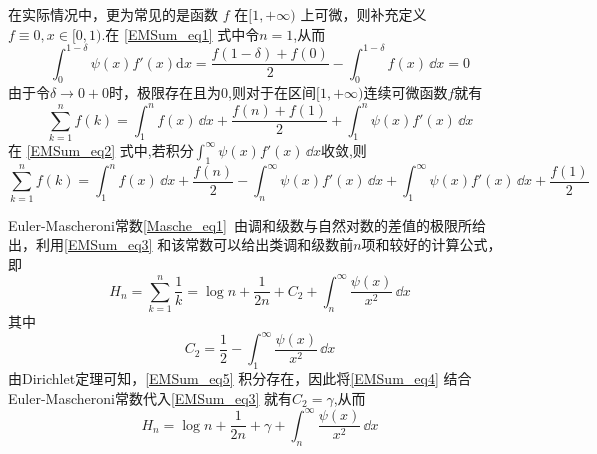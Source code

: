 在实际情况中，更为常见的是函数 $f$ 在$[1,+\infty)$ 上可微，则补充定义$ f\equiv 0,x\in[0,1)$.在 \autoref{EMSum_eq1} 式中令$n=1$,从而
\[
    \int_{0}^{1-\delta}\psi(x)f'(x)\mathrm{d}x
    =\frac{f(1-\delta)+f(0)}{2}-\int_{0}^{1-\delta}f(x)\,\dd x=0
\]
由于令$\delta\to0+0$时，极限存在且为$0$,则对于在区间$[1,+\infty)$连续可微函数$f$就有
\begin{equation}\label{EMSum_eq2}
    \sum_{k=1}^{n}f(k)
    =\int_{1}^{n}f(x)\,\dd x+\frac{f(n)+f(1)}{2}+\int_{1}^{n}\psi(x)f'(x)\,\dd x
\end{equation}
在 \autoref{EMSum_eq2}  式中,若积分$\displaystyle{\int_{1}^{\infty}\psi(x)f'(x)\,\dd x}$收敛,则
\begin{equation}\label{EMSum_eq3}
    \sum_{k=1}^{n}f(k)=\int_{1}^{n}f(x)\,\dd x
    +\frac{f(n)}{2}-\int_{n}^{\infty}\psi(x)f'(x)\,\dd x
    +\int_{1}^{\infty}\psi(x)f'(x)\,\dd x+\frac{f(1)}{2}
\end{equation}
\begin{exercise}{}
Euler-Mascheroni常数\autoref{Masche_eq1}~由调和级数与自然对数的差值的极限所给出，利用\autoref{EMSum_eq3} 和该常数可以给出类调和级数前$n$项和较好的计算公式，即
\begin{equation}\label{EMSum_eq4}
    H_{n}=\sum_{k=1}^{n}\frac{1}{k}=\log n+\frac{1}{2n}+C_{2}
    +\int_{n}^{\infty}\frac{\psi(x)}{x^2}\,\dd x
\end{equation}
其中
\begin{equation}\label{EMSum_eq5}
    C_{2}=\frac{1}{2}-\int_{1}^{\infty}\frac{\psi(x)}{x^2}\,\dd x
\end{equation}
由Dirichlet定理可知，\autoref{EMSum_eq5} 积分存在，因此将\autoref{EMSum_eq4} 结合
Euler-Mascheroni常数代入\autoref{EMSum_eq3} 就有$C_{2}=\gamma$,从而
\begin{equation}
    H_{n}=\log n+\frac{1}{2n}+\gamma+\int_{n}^{\infty}\frac{\psi(x)}{x^2}\,\dd x
\end{equation}
\end{exercise}




